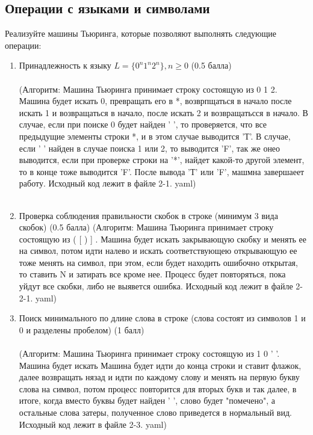 \documentclass{article}
\begin{document}
\subsection{Операции с языками и символами}

Реализуйте машины Тьюринга, которые позволяют выполнять следующие операции:
\begin{enumerate}
    \item Принадлежность к языку $L = \{ 0^n1^n2^n \}, n \ge 0$ (0.5 балла)\\\\
    \text(Алгоритм: Машина Тьюринга принимает строку состоящую из 0 1 2. Машина будет искать 0, превращать его в *, возврпщаться в начало после искать 1 и возвращаться в начало, после искать 2 и возвращатьсся в начало. В случае, если при поиске 0 будет найден ' ', то проверяется, что все предыдущие элементы строки *, и в этом случае выводится 'Т'. В случае, если ' ' найден в случае поиска 1 или 2, то выводится 'F', так же онео выводится, если при проверке строки на '*', найдет какой-то другой элемент, то в конце тоже выводится 'F'. После вывода 'Т' или 'F', машмна завершаеет работу. Исходный код лежит в файле 2-1. yaml)\\\\
    \item Проверка соблюдения правильности скобок в строке (минимум 3 вида скобок) (0.5 балла)
    \text(Алгоритм: Машина Тьюринга принимает строку состоящую из ( { [ ) ] }. Машина будет искать закрывающую скобку и менять ее на символ, потом идти налево и искать соответствующею открывающую ее тоже менять на символ, при этом, если будет находить ошибочно открытая, то ставить N и затирать все кроме нее. Процесс будет повторяться, пока уйдут все скобки, либо не выявется ошибка. Исходный код лежит в файле 2-2-1. yaml)
    \item Поиск минимального по длине слова в строке (слова состоят из символов 1 и 0 и разделены пробелом) (1 балл)\\\\
    \text(Алгоритм: Машина Тьюринга принимает строку состоящую из 1 0 ' '. Машина будет искать Машина будет идти до конца строки и ставит флажок, далее возвращать нязад и идти по каждому слову и менять на первую букву слова на символ, потом процесс повторится для вторых букв и так далее, в итоге, когда вместо буквы будет найден ' ', слово будет "помечено", а остальные слова затеры, полученное слово приведется в нормальный вид. Исходный код лежит в файле 2-3. yaml)
\end{enumerate}
\end{document}
